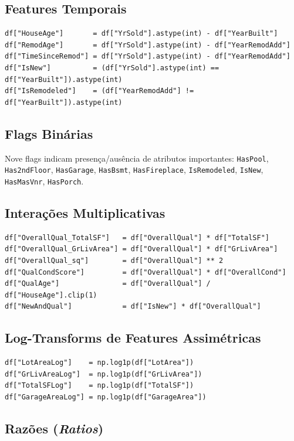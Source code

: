 \documentclass[12pt,a4paper]{article}
\begin{document}
\subsection{Features Temporais}
\label{sec:org577b28c}

\begin{verbatim}
df["HouseAge"]       = df["YrSold"].astype(int) - df["YearBuilt"]
df["RemodAge"]       = df["YrSold"].astype(int) - df["YearRemodAdd"]
df["TimeSinceRemod"] = df["YrSold"].astype(int) - df["YearRemodAdd"]
df["IsNew"]          = (df["YrSold"].astype(int) == df["YearBuilt"]).astype(int)
df["IsRemodeled"]    = (df["YearRemodAdd"] != df["YearBuilt"]).astype(int)
\end{verbatim}
\subsection{Flags Binárias}
\label{sec:orgf539038}

Nove flags indicam presença/ausência de atributos importantes:
\texttt{HasPool}, \texttt{Has2ndFloor}, \texttt{HasGarage}, \texttt{HasBsmt}, \texttt{HasFireplace},
\texttt{IsRemodeled}, \texttt{IsNew}, \texttt{HasMasVnr}, \texttt{HasPorch}.
\subsection{Interações Multiplicativas}
\label{sec:orgad435f1}

\begin{verbatim}
df["OverallQual_TotalSF"]   = df["OverallQual"] * df["TotalSF"]
df["OverallQual_GrLivArea"] = df["OverallQual"] * df["GrLivArea"]
df["OverallQual_sq"]        = df["OverallQual"] ** 2
df["QualCondScore"]         = df["OverallQual"] * df["OverallCond"]
df["QualAge"]               = df["OverallQual"] / df["HouseAge"].clip(1)
df["NewAndQual"]            = df["IsNew"] * df["OverallQual"]
\end{verbatim}
\subsection{Log-Transforms de Features Assimétricas}
\label{sec:org16fb799}

\begin{verbatim}
df["LotAreaLog"]    = np.log1p(df["LotArea"])
df["GrLivAreaLog"]  = np.log1p(df["GrLivArea"])
df["TotalSFLog"]    = np.log1p(df["TotalSF"])
df["GarageAreaLog"] = np.log1p(df["GarageArea"])
\end{verbatim}
\subsection{Razões (\emph{Ratios})}
\label{sec:org69fdc3c}
\end{document}
